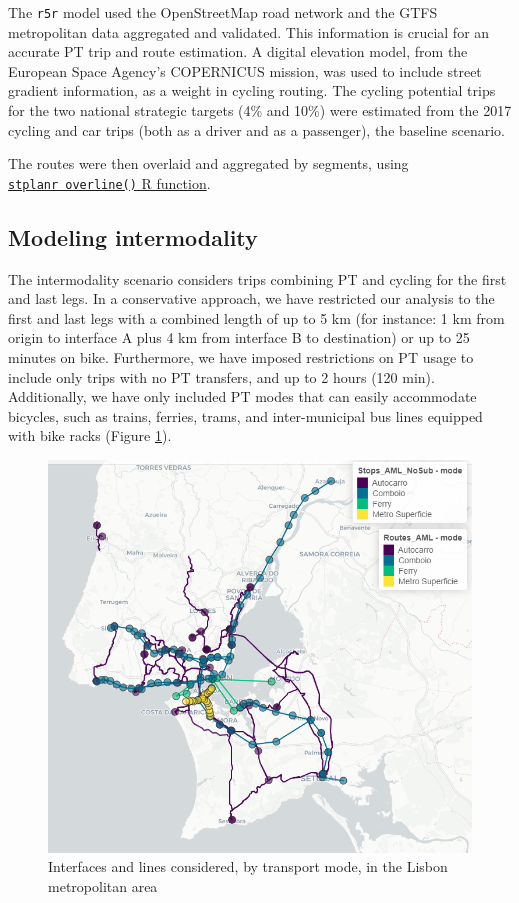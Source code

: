 \documentclass[review, doubleblind, 3p,
authoryear]{elsarticle} %
\begin{document}
The \texttt{r5r} model used the OpenStreetMap road network and the GTFS
metropolitan data aggregated and validated. This information is crucial
for an accurate PT trip and route estimation. A digital elevation model,
from the European Space Agency's COPERNICUS mission, was used to include
street gradient information, as a weight in cycling routing. The cycling
potential trips for the two national strategic targets (4\% and 10\%)
were estimated from the 2017 cycling and car trips (both as a driver and
as a passenger), the baseline scenario.

The routes were then overlaid and aggregated by segments, using
\href{https://docs.ropensci.org/stplanr/reference/overline.html}{\texttt{stplanr\ overline()}
R function}.

\hypertarget{modeling-intermodality}{%
\subsection{Modeling intermodality}\label{modeling-intermodality}}

The intermodality scenario considers trips combining PT and cycling for
the first and last legs. In a conservative approach, we have restricted
our analysis to the first and last legs with a combined length of up to
5 km (for instance: 1 km from origin to interface A plus 4 km from
interface B to destination) or up to 25 minutes on bike. Furthermore, we
have imposed restrictions on PT usage to include only trips with no PT
transfers, and up to 2 hours (120 min). Additionally, we have only
included PT modes that can easily accommodate bicycles, such as trains,
ferries, trams, and inter-municipal bus lines equipped with bike racks
(Figure \ref{fig:map1}).

\begin{figure}

{\centering \includegraphics[width=0.6\linewidth,]{img/map1} 

}

\caption{Interfaces and lines considered, by transport mode, in the Lisbon metropolitan area}\label{fig:map1}
\end{figure}
\end{document}
